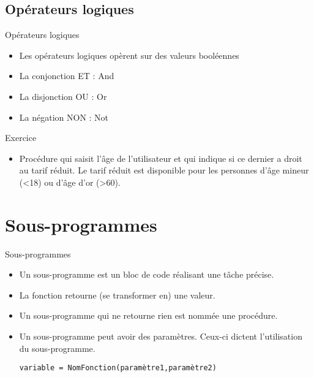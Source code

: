 \documentclass[aspectratio=169,usenames,dvipsnames]{beamer}
\begin{document}
    \subsection{Opérateurs logiques}
    \begin{frame}[fragile]{Opérateurs logiques}
        \begin{itemize}
            \item Les opérateurs logiques opèrent sur des valeurs booléennes
            \item La conjonction ET : And
            \item La disjonction OU : Or
            \item La négation NON : Not
        \end{itemize}
    \end{frame}
    \begin{frame}[fragile]{Exercice}
        \begin{itemize}
            \item Procédure qui saisit l'âge de l'utilisateur et qui indique si ce dernier a droit au tarif réduit. Le tarif réduit est disponible pour les personnes d’âge mineur (<18) ou d’âge d'or (>60).
        \end{itemize}
    \end{frame}
    \section{Sous-programmes}
    \begin{frame}[fragile]{Sous-programmes}
        \begin{itemize}
            \item Un sous-programme est un bloc de code réalisant une tâche précise.
            \item La fonction retourne (se transformer en) une valeur.
            \item Un sous-programme qui ne retourne rien est nommée une procédure.
            \item Un sous-programme peut avoir des paramètres. Ceux-ci dictent l'utilisation du sous-programme.
        \begin{lstlisting}
variable = NomFonction(paramètre1,paramètre2)
        \end{lstlisting}
        \end{itemize}
    \end{frame}
\end{document}
